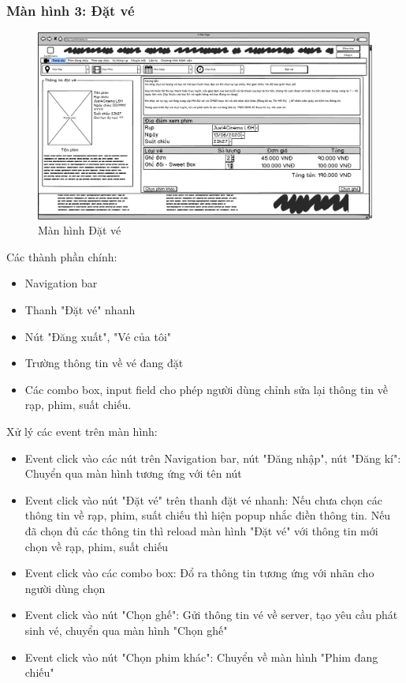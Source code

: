 \documentclass[a4paper, 12pt]{article}
\begin{document}
		\subsubsection{Màn hình 3: Đặt vé}
			\begin{figure}[H]
				\begin{center}
					\includegraphics[scale = 0.25]{Wireframe/User/Đặt vé.png}
					\caption{Màn hình Đặt vé}
				\end{center}
			\end{figure}
			Các thành phần chính: 
			\begin{itemize}
				\item Navigation bar
				\item Thanh "Đặt vé" nhanh
				\item Nút "Đăng xuất", "Vé của tôi"
				\item Trường thông tin về vé đang đặt
				\item Các combo box, input field cho phép người dùng chỉnh sửa lại thông tin về rạp, phim, suất chiếu.
			\end{itemize}
			Xử lý các event trên màn hình:
			\begin{itemize}
				\item Event click vào các nút trên Navigation bar, nút "Đăng nhập", nút "Đăng kí": Chuyển qua màn hình tương ứng với tên nút
				\item Event click vào nút "Đặt vé" trên thanh đặt vé nhanh: Nếu chưa chọn các thông tin về rạp, phim, suất chiếu thì hiện popup nhắc điền thông tin. Nếu đã chọn đủ các thông tin thì reload màn hình "Đặt vé" với thông tin mới chọn về rạp, phim, suất chiếu
				\item Event click vào các combo box: Đổ ra thông tin tương ứng với nhãn cho người dùng chọn
				\item Event click vào nút "Chọn ghế": Gửi thông tin vé về server, tạo yêu cầu phát sinh vé, chuyển qua màn hình "Chọn ghế"
				\item Event click vào nút "Chọn phim khác": Chuyển về màn hình "Phim đang chiếu"
			\end{itemize}
\end{document}
